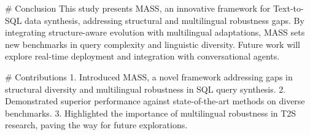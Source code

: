 # Conclusion  
This study presents MASS, an innovative framework for Text-to-SQL data synthesis, addressing structural and multilingual robustness gaps. By integrating structure-aware evolution with multilingual adaptations, MASS sets new benchmarks in query complexity and linguistic diversity. Future work will explore real-time deployment and integration with conversational agents.

# Contributions  
1. Introduced MASS, a novel framework addressing gaps in structural diversity and multilingual robustness in SQL query synthesis.  
2. Demonstrated superior performance against state-of-the-art methods on diverse benchmarks.  
3. Highlighted the importance of multilingual robustness in T2S research, paving the way for future explorations.  